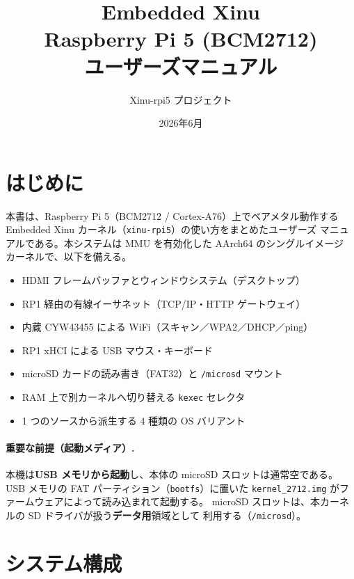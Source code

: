 \documentclass[a4paper,11pt]{ltjsarticle}
\title{\textbf{Embedded Xinu\\ Raspberry Pi 5 (BCM2712) \\ ユーザーズマニュアル}}
\author{Xinu-rpi5 プロジェクト}
\date{2026年6月}
\begin{document}
\maketitle
\tableofcontents
\newpage

\section{はじめに}
本書は、Raspberry Pi 5（BCM2712 / Cortex-A76）上でベアメタル動作する
Embedded Xinu カーネル（\texttt{xinu-rpi5}）の使い方をまとめたユーザーズ
マニュアルである。本システムは MMU を有効化した AArch64 のシングルイメージ
カーネルで、以下を備える。

\begin{itemize}[noitemsep]
  \item HDMI フレームバッファとウィンドウシステム（デスクトップ）
  \item RP1 経由の有線イーサネット（TCP/IP・HTTP ゲートウェイ）
  \item 内蔵 CYW43455 による WiFi（スキャン／WPA2／DHCP／ping）
  \item RP1 xHCI による USB マウス・キーボード
  \item microSD カードの読み書き（FAT32）と \texttt{/microsd} マウント
  \item RAM 上で別カーネルへ切り替える \texttt{kexec} セレクタ
  \item 1 つのソースから派生する 4 種類の OS バリアント
\end{itemize}

\paragraph{重要な前提（起動メディア）.}
本機は\textbf{USB メモリから起動}し、本体の microSD スロットは通常空である。
USB メモリの FAT パーティション（\texttt{bootfs}）に置いた
\texttt{kernel\_2712.img} がファームウェアによって読み込まれて起動する。
microSD スロットは、本カーネルの SD ドライバが扱う\textbf{データ用}領域として
利用する（\texttt{/microsd}）。

\section{システム構成}
\end{document}
